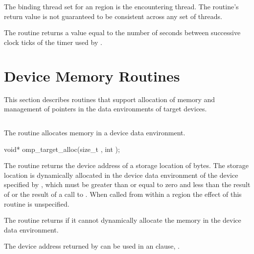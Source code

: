 \binding
The binding thread set for an  region is the encountering thread. The 
routine’s return value is not guaranteed to be consistent across any set of threads.

\effect
The  routine returns a value equal to the number of seconds between 
successive clock ticks of the timer used by .







\pagebreak
\ccppspecificstart
\vspace{-3\baselineskip}
\section{Device Memory Routines}
\label{sec:Device Memory Routines}
This section describes routines that support allocation of memory and 
management of pointers in the data environments of target devices.


\subsection{}
\label{subsec:omp_target_alloc}
\summary
The  routine allocates memory in a device data
environment.

\format
\begin{boxedcode}
void* omp\_target\_alloc(size\_t , int );
\end{boxedcode}

\effect

The  routine returns the device address of a storage
location of  bytes. The storage location is dynamically allocated in
the device data environment of the device specified by , which
must be greater than or equal to zero and less than the result of
 or the result of a call to
. When called from within a  region 
the effect of this routine is unspecified.

The  routine returns  if it cannot dynamically
allocate the memory in the device data environment. 

The device address returned by  can be used in an 
 clause, .

